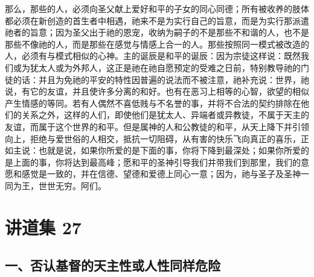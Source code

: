那么，那些的人，必须向圣父献上爱好和平的子女的同心同德；所有被收养的肢体都必须在新创造的首生者中相遇，祂来不是为实行自己的旨意，而是为实行那派遣祂者的旨意；因为圣父出于祂的恩宠，收纳为嗣子的不是那些不和谐的人，也不是那些不像祂的人，而是那些在感觉与情感上合一的人。那些按照同一模式被改造的人，必须有与模式相似的心神。主的诞辰是和平的诞辰：因为宗徒这样说：既然我们或为犹太人或为外邦人，这正是祂在祂自愿预定的受难之日前，特别教导祂的门徒的话：并且为免祂的平安的特性因普遍的说法而不被注意，祂补充说：世界，祂说，有它的友谊，并且使许多分离的和好。也有在恶习上相等的心智，欲望的相似产生情感的等同。若有人偶然不喜低贱与不名誉的事，并将不合法的契约排除在他们的关系之外，这样的人们，即使他们是犹太人、异端者或异教徒，不属于天主的友谊，而属于这个世界的和平。但是属神的人和公教徒的和平，从天上降下并引领向上，拒绝与爱世俗的人相交，抵抗一切阻碍，从有害的快乐飞向真正的喜乐，正如主说：也就是说，如果你所爱的是下面的事，你将下降到最深处；如果你所爱的是上面的事，你将达到最高峰；愿和平的圣神引导我们并带我们到那里，我们的意愿和感觉是一致的，并在信德、望德和爱德上同心一意；因为，祂与圣子及圣神一同为王，世世无穷。阿们。\par



\section{讲道集 27}

\par


\subsection{一、否认基督的天主性或人性同样危险}

